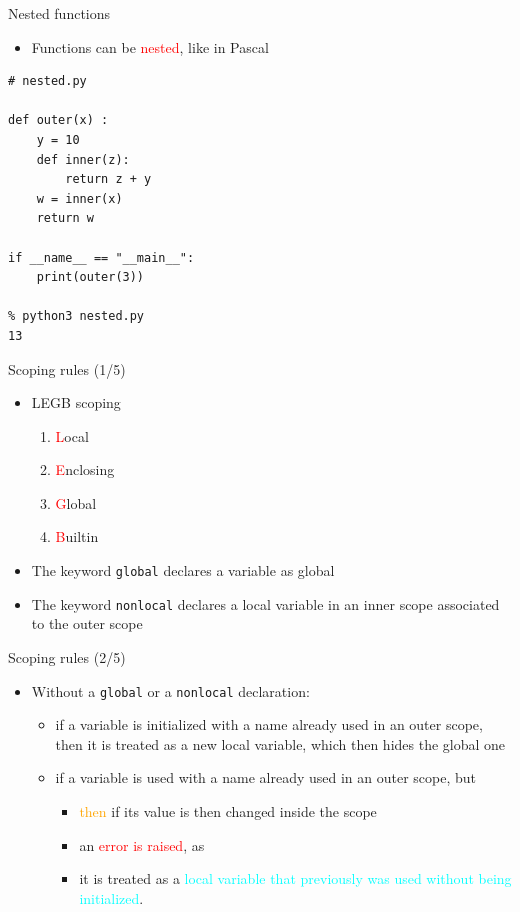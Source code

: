 \documentclass{beamer}
\begin{document}
\begin{frame}[fragile]
{\centerline{Nested functions}}
\begin{itemize}
    \item Functions can be \textcolor{red}{nested}, like in Pascal
     \end{itemize}
 \begin{lstlisting}[style=myPythonStyle]
# nested.py

def outer(x) :
	y = 10
	def inner(z):
		return z + y
	w = inner(x)
	return w

if __name__ == "__main__":
	print(outer(3))
	
% python3 nested.py 
13

\end{lstlisting}


\end{frame}

\begin{frame}[fragile]
{\centerline{Scoping rules (1/5)}}
\begin{itemize}
    \item LEGB scoping
    \begin{enumerate}
    \item \textcolor{red}{L}ocal
    \item \textcolor{red}{E}nclosing
    \item \textcolor{red}{G}lobal
     \item \textcolor{red}{B}uiltin
        \end{enumerate}
        \item The keyword \texttt{global} declares a variable as global
       \item The keyword \texttt{nonlocal} declares a local variable in an inner scope associated to the outer scope
    \end{itemize}
\end{frame}

\begin{frame}[fragile]
{\centerline{Scoping rules (2/5)}}
\begin{itemize}
       \item Without a \texttt{global} or a \texttt{nonlocal}  declaration:
       \begin{itemize}
		\item if a variable is initialized with a name already used in an outer scope, then it is treated as a new local variable, which then hides the global one
		\item if a variable is used with a name already used in an outer scope, but
		       \begin{itemize}
		       		\item \textcolor{orange}{then} if its value is then changed inside the scope 
		       		\item  an \textcolor{red}{error is raised}, as
				\item  it is treated as a \textcolor{cyan}{local variable that previously was used without being initialized}.
    			\end{itemize}
        \end{itemize}
    \end{itemize}
\end{frame}
\end{document}
